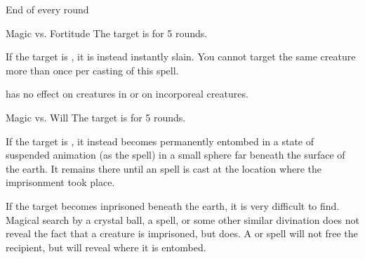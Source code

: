\begin{spellheader}
    \spellrng{\rngclose}
\end{spellheader}
\begin{spelleffects}
    \begin{spelltrigger}{End of every round}
        \begin{spellattack}{Magic vs. Fortitude}
            \spellsuccess The target is \staggered for 5 rounds.

            If the target is \bloodied, it is instead instantly slain.
            \spellspecial You cannot target the same creature more than once per casting of this spell.
        \end{spellattack}
    \end{spelltrigger}
\end{spelleffects}
\begin{spellfooter}
    \spellnotes {} has no effect on creatures in  or on incorporeal creatures.
\end{spellfooter}

\begin{spellheader}
    \spellrng{\rngclose}
\end{spellheader}
\begin{spelleffects}
    \begin{spellattack}{Magic vs. Will}
        \spellsuccess The target is \slowed for 5 rounds.

        \spellsuccess If the target is \bloodied, it instead becomes permanently entombed in a state of suspended animation (as the  spell) in a small sphere far beneath the surface of the earth. It remains there until an  spell is cast at the location where the imprisonment took place.
    \end{spellattack}

\end{spelleffects}
\begin{spellfooter}
    \spellnotes If the target becomes inprisoned beneath the earth, it is very difficult to find. Magical search by a crystal ball, a  spell, or some other similar divination does not reveal the fact that a creature is imprisoned, but  does. A  or  spell will not free the recipient, but will reveal where it is entombed.
\end{spellfooter}

